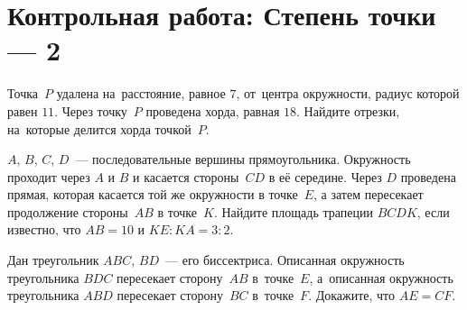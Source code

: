 
\section*{Контрольная работа: Степень точки --- 2}



\begin{problems}

\item
Точка~$P$ удалена на~расстояние, равное $7$, от~центра окружности, радиус
которой равен $11$.
Через точку~$P$ проведена хорда, равная $18$.
Найдите отрезки, на~которые делится хорда точкой~$P$.

\item
$A$, $B$, $C$, $D$~--- последовательные вершины прямоугольника.
Окружность проходит через $A$ и $B$ и касается стороны~$CD$ в её середине.
Через $D$ проведена прямая, которая касается той же окружности в точке~$E$,
а затем пересекает продолжение стороны~$AB$ в точке~$K$.
Найдите площадь трапеции $BCDK$, если известно, что $AB = 10$
и $KE : KA = 3 : 2$.

\item
Дан треугольник $ABC$, $BD$~--- его биссектриса.
Описанная окружность треугольника $BDC$ пересекает сторону~$AB$ в~точке~$E$,
а~описанная окружность треугольника $ABD$ пересекает сторону~$BC$ в~точке~$F$.
Докажите, что $AE = CF$.

\end{problems}

